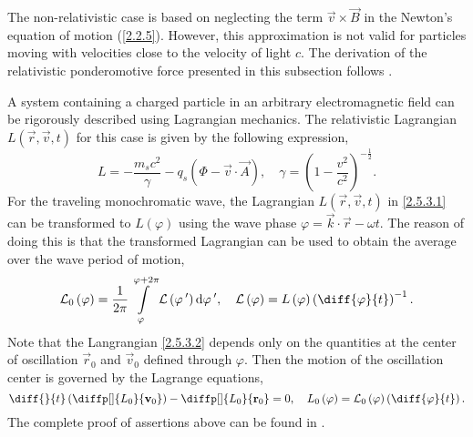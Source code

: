 The non-relativistic case is based on neglecting the term $ \vec{v} \times \vec{B} $ in the Newton's equation of motion (\ref{2.2.5}). However, this approximation is not valid for particles moving with velocities close to the velocity of light $ c $. The derivation of the relativistic ponderomotive force presented in this subsection follows \cite{Bauer1995, Mulser2010}.

A system containing a charged particle in an arbitrary electromagnetic field can be rigorously described using Lagrangian mechanics. The relativistic Lagrangian $ L \left( \vec{r}, \vec{v}, t \right)  $ for this case is given by the following expression,
\begin{equation}
\label{2.5.3.1}
L = -\frac{m_s c^2}{\gamma} - q_s \left(\Phi - \vec{v} \cdot \vec{A} \right), \quad \gamma = \left( 1 - \frac{v^{2}}{c^{2}} \right)^{-\frac{1}{2}}.
\end{equation}
For the traveling monochromatic wave, the Lagrangian $ L \left( \vec{r}, \vec{v}, t \right)  $ in \ref{2.5.3.1} can be transformed to $ L \left( \varphi \right)  $ using the wave phase $ \varphi = \vec{k} \cdot \vec{r} - \omega t $. The reason of doing this is that the transformed Lagrangian can be used to obtain the average over the wave period of motion,
\begin{equation}
\label{2.5.3.2}
\mathcal{L}_0 \left( \varphi \right) = \frac{1}{2 \pi} \int \limits_{\varphi}^{\varphi + 2\pi} \mathcal{L} \left( \varphi^{\: \prime} \right) \mathrm{d} \varphi^{\: \prime}, \quad \mathcal{L} \left( \varphi \right) = L \left( \varphi \right) \left( \diff{\varphi}{t} \right)^{-1}.
\end{equation}
Note that the Langrangian \ref{2.5.3.2} depends only on the quantities at the center of oscillation $ \vec{r}_0 $ and $ \vec{v}_0 $ defined through $ \varphi $. Then the motion of the oscillation center is governed by the Lagrange equations,
\begin{equation}
\label{2.5.3.3}
\diff{}{t} \left( \diffp[]{L_0}{\vec{v}_0} \right) -  \diffp[]{L_0}{\vec{r}_0} = 0, \quad L_0 \left( \varphi \right) = \mathcal{L}_0 \left( \varphi \right) \left( \diff{\varphi}{t} \right).
\end{equation}
The complete proof of assertions above can be found in \cite{Bauer1995}.

